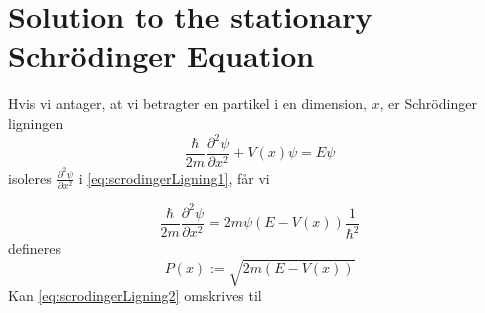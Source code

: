 \section{Solution to the stationary Schrödinger Equation}
Hvis vi antager, at vi betragter en partikel i en dimension, $x$,  er Schrödinger ligningen
\begin{equation}
    \frac{\hbar}{2m}\frac{\partial^2 \psi}{\partial x^2} + V(x) \psi = E \psi
    \label{eq:scrodingerLigning1}
\end{equation}
isoleres $\frac{\partial^2 \psi}{\partial x^2}$ i \cref{eq:scrodingerLigning1}, får vi

\begin{equation}
    \frac{\hbar}{2m}\frac{\partial^2 \psi}{\partial x^2} = 2m\psi (E  - V(x)) \frac{1}{\hbar^2}
    \label{eq:scrodingerLigning2}
\end{equation}
defineres
\begin{equation}
P(x) := \sqrt{2m(E-V(x))}
\end{equation}
Kan \cref{eq:scrodingerLigning2} omskrives til

\begin{equation}
    
    \label{eq:scrodingerLigning3}
\end{equation}
